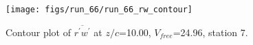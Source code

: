 \begin{figure}[H]
\centering
\texttt{[image: figs/run\_66/run\_66\_rw\_contour]}
\caption{Contour plot of $\overline{r^\prime w^\prime}$ at $z/c$=10.00, $V_{free}$=24.96, station 7.}
\end{figure}


